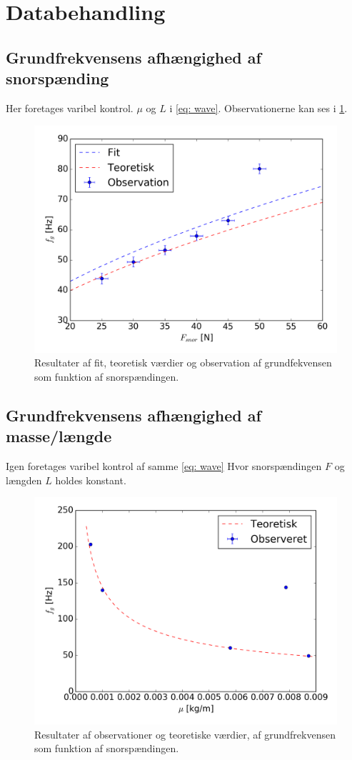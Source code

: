 \documentclass[A2_main.tex]{subfiles}
\begin{document}
\section{Databehandling}
\subsection{Grundfrekvensens afhængighed af snorspænding}
Her foretages varibel kontrol. $\mu$ og $L$ i \cref{eq: wave}. Observationerne kan ses i \cref{fig:frekvensSNor}.
\begin{figure}[H]
    \includegraphics[width=\linewidth]{frekvensSnorSpaending.png}
    \caption{Resultater af fit, teoretisk værdier og observation af grundfekvensen som funktion af snorspændingen.}
    \label{fig:frekvensSNor}
\end{figure}

\subsection{Grundfrekvensens afhængighed af masse/længde}
Igen foretages varibel kontrol af samme \cref{eq: wave} Hvor snorspændingen $F$ og længden $L$ holdes konstant.
\begin{figure}[H]
    \includegraphics[width=\linewidth]{frekvensMu.png}
    \caption{Resultater af observationer og teoretiske værdier, af grundfrekvensen som funktion af snorspændingen.}
    \label{fig:frekvensMu}
\end{figure}
\end{document}
